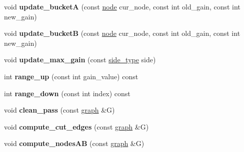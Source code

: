 \begin{DoxyCompactItemize}
\item 
\mbox{\label{classfm__partition_aa4ec83c52916cc6cac23e7a9987427cd}} 
void {\bfseries update\+\_\+bucketA} (const \mbox{\hyperlink{classnode}{node}} cur\+\_\+node, const int old\+\_\+gain, const int new\+\_\+gain)
\item 
\mbox{\label{classfm__partition_a270d469ca584ed9adff9fced67743679}} 
void {\bfseries update\+\_\+bucketB} (const \mbox{\hyperlink{classnode}{node}} cur\+\_\+node, const int old\+\_\+gain, const int new\+\_\+gain)
\item 
\mbox{\label{classfm__partition_a335722b73c1d6f02d1083e76a3937b01}} 
void {\bfseries update\+\_\+max\+\_\+gain} (const \mbox{\hyperlink{classfm__partition_a7cdff1bea3740a287387e8408e16ca79}{side\+\_\+type}} side)
\item 
\mbox{\label{classfm__partition_ac49d477ecbf512fa375b76a472ec54f8}} 
int {\bfseries range\+\_\+up} (const int gain\+\_\+value) const
\item 
\mbox{\label{classfm__partition_ab0bfbda97056ac75ab5fbfa6fd20fd03}} 
int {\bfseries range\+\_\+down} (const int index) const
\item 
\mbox{\label{classfm__partition_a15197263e5318f824e0cde66ea9132b7}} 
void {\bfseries clean\+\_\+pass} (const \mbox{\hyperlink{classgraph}{graph}} \&G)
\item 
\mbox{\label{classfm__partition_a03c76998f985593caddc4979a28b9042}} 
void {\bfseries compute\+\_\+cut\+\_\+edges} (const \mbox{\hyperlink{classgraph}{graph}} \&G)
\item 
\mbox{\label{classfm__partition_aaa8f24af3be860bfa42a171c25420c2c}} 
void {\bfseries compute\+\_\+nodes\+AB} (const \mbox{\hyperlink{classgraph}{graph}} \&G)
\end{DoxyCompactItemize}
